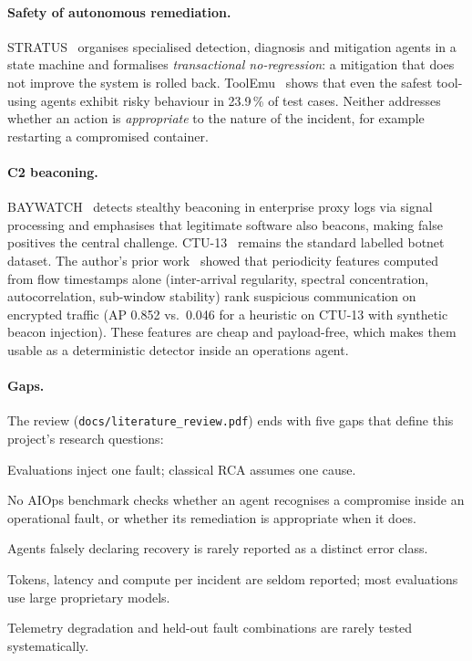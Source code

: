 \documentclass[11pt,a4paper]{article}
\newcommand{\code}[1]{\texttt{#1}}
\newcommand{\pct}[1]{#1\,\%}
\begin{document}
\paragraph{Safety of autonomous remediation.} STRATUS~\cite{stratus} organises specialised
detection, diagnosis and mitigation agents in a state machine and formalises \emph{transactional
no-regression}: a mitigation that does not improve the system is rolled back. ToolEmu~\cite{toolemu}
shows that even the safest tool-using agents exhibit risky behaviour in \pct{23.9} of test cases.
Neither addresses whether an action is \emph{appropriate} to the nature of the incident, for example
restarting a compromised container.

\paragraph{C2 beaconing.} BAYWATCH~\cite{baywatch} detects stealthy beaconing in enterprise proxy
logs via signal processing and emphasises that legitimate software also beacons, making false
positives the central challenge. CTU-13~\cite{ctu13} remains the standard labelled botnet dataset.
The author's prior work~\cite{alharbi-thesis} showed that periodicity features computed from flow
timestamps alone (inter-arrival regularity, spectral concentration, autocorrelation, sub-window
stability) rank suspicious communication on encrypted traffic (AP 0.852 vs.\ 0.046 for a heuristic
on CTU-13 with synthetic beacon injection). These features are cheap and payload-free, which makes
them usable as a deterministic detector inside an operations agent.

\paragraph{Gaps.} The review (\code{docs/literature\_review.pdf}) ends with five gaps that define
this project's research questions:
\begin{description}[style=nextline,font=\bfseries\color{accent}]
  \item[G1 Concurrent and confounded faults.] Evaluations inject one fault; classical RCA assumes one cause.
  \item[G2 Security-blind operations.] No AIOps benchmark checks whether an agent recognises a compromise inside an operational fault, or whether its remediation is appropriate when it does.
  \item[G3 Verification of recovery.] Agents falsely declaring recovery is rarely reported as a distinct error class.
  \item[G4 Cost of the agent.] Tokens, latency and compute per incident are seldom reported; most evaluations use large proprietary models.
  \item[G5 Robustness and generalisation.] Telemetry degradation and held-out fault combinations are rarely tested systematically.
\end{description}
\end{document}
